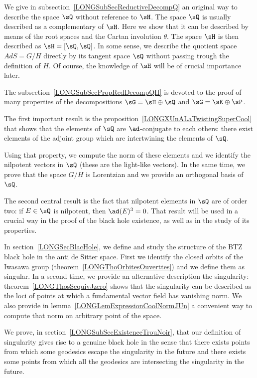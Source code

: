 We give in subsection~\ref{LONGSubSecReductiveDecompQ} an original way to describe the space $\sQ$ without reference to $\sH$. The space $\sQ$ is usually described as a complementary of $\sH$. Here we show that it can be described by means of the root spaces and the Cartan involution $\theta$. The space $\sH$ is then described as $\sH=[\sQ,\sQ]$. In some sense, we describe the quotient space $AdS=G/H$ directly by its tangent space $\sQ$ without passing trough the definition of $H$. Of course, the knowledge of $\sH$ will be of crucial importance later.


The subsection~\ref{LONGSubSecPropRedDecompQH} is devoted to the proof of many properties of the decompositions $\sG=\sH\oplus\sQ$ and $\sG=\sK\oplus\sP$.


The first important result is the proposition~\ref{LONGXUnALaTwistingSuperCool} that shows that the elements of $\sQ$ are $\ad$-conjugate to each others: there exist elements of the adjoint group which are intertwining the elements of $\sQ$.

Using that property, we compute the norm of these elements and we identify the nilpotent vectors in $\sQ$ (these are the light-like vectors). In the same time, we prove that the space $G/H$ is Lorentzian and we provide an orthogonal basis of $\sQ$.

The second central result is the fact that nilpotent elements in $\sQ$ are of order two: if $E\in\sQ$ is nilpotent, then $\ad(E)^3=0$. That result will be used in a crucial way in the proof of the black hole existence, as well as in the study of its properties.

In section~\ref{LONGSecBlacHole}, we define and study the structure of the BTZ black hole in the anti de Sitter space. First we identify the closed orbits of the Iwasawa group (theorem~\ref{LONGThoOrbitesOuverttes}) and we define them as singular. In a second time, we provide an alternative description the singularity: theorem~\ref{LONGThosSequivJzero} shows that the singularity can be described as the loci of points at which a fundamental vector field has vanishing norm. We also provide in lemma~\ref{LONGLemExpressionCoolNormJUn} a convenient way to compute that norm on arbitrary point of the space.

We prove, in section~\ref{LONGSubSecExistenceTrouNoir}, that our definition of singularity gives rise to a genuine black hole in the sense that there exists points from which some geodesics escape the singularity in the future and there exists some points from which all the geodesics are intersecting the singularity in the future.

